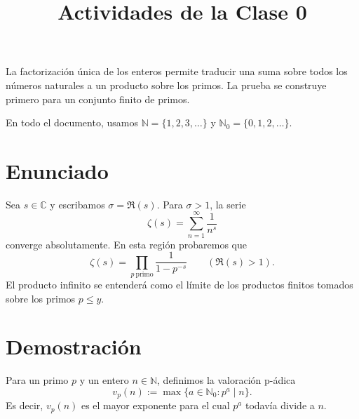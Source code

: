 \documentclass[11pt,a4paper]{article}
\title{Actividades de la Clase 0}
\author{}
\date{}
\newcommand{\N}{\mathbb{N}}
\begin{document}
\maketitle
{}\par


La factorización única de los enteros permite traducir una suma sobre todos los
números naturales a un producto sobre los primos. La prueba se construye primero
para un conjunto finito de primos.

En todo el documento, usamos $\N=\{1,2,3,\ldots\}$ y
$\mathbb{N}_0=\{0,1,2,\ldots\}$.

\section{Enunciado}

Sea $s\in\mathbb{C}$ y escribamos $\sigma=\Re(s)$. Para
$\sigma>1$, la serie
\[
  \zeta(s)=\sum_{n=1}^{\infty}\frac{1}{n^s}
\]
converge absolutamente. En esta región probaremos que
\[
  \zeta(s)=\prod_{p\ \mathrm{primo}}\frac{1}{1-p^{-s}}
  \qquad (\Re(s)>1).
\]
El producto infinito se entenderá como el límite de los productos finitos
tomados sobre los primos $p\le y$.

\section{Demostración}

Para un primo $p$ y un entero $n\in\mathbb{N}$, definimos la valoración p-ádica
\[
  v_p(n):=\max\{a\in\mathbb{N}_0:p^a\mid n\}.
\]
Es decir, $v_p(n)$ es el mayor exponente para el cual $p^a$ todavía divide a
$n$.
\end{document}

